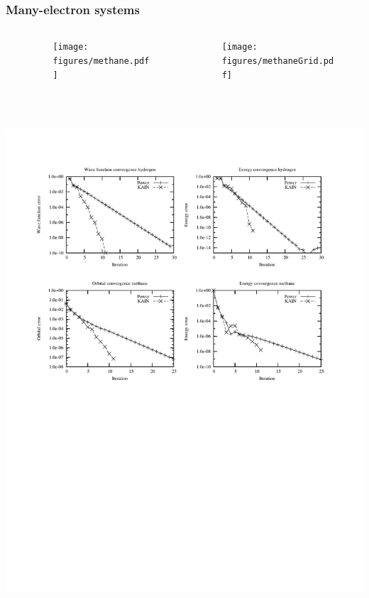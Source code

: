 \documentclass[mathserif, 8pt]{beamer}
\begin{document}
\begin{frame}
    \frametitle{Many-electron systems}
    \begin{columns}
    \begin{column}[b]{0.20\linewidth}
	\ \\
	\ \\
    \end{column}
    \begin{column}[b]{0.30\linewidth}
    \begin{figure}
	\centering
	\texttt{[image: figures/methane.pdf]}\\
	\ \\
	\ \\
    \end{figure}
    \end{column}
    \begin{column}[b]{0.50\linewidth}
    \begin{figure}
	\begin{center}
	\texttt{[image: figures/methaneGrid.pdf]}\\
	\end{center}
    \end{figure}
    \end{column}
    \end{columns}
    \begin{center}
	\includegraphics[scale=0.6, clip, viewport = 50 350 550 540]{figures/convergence.pdf}
    \end{center}
\end{frame}
\end{document}
